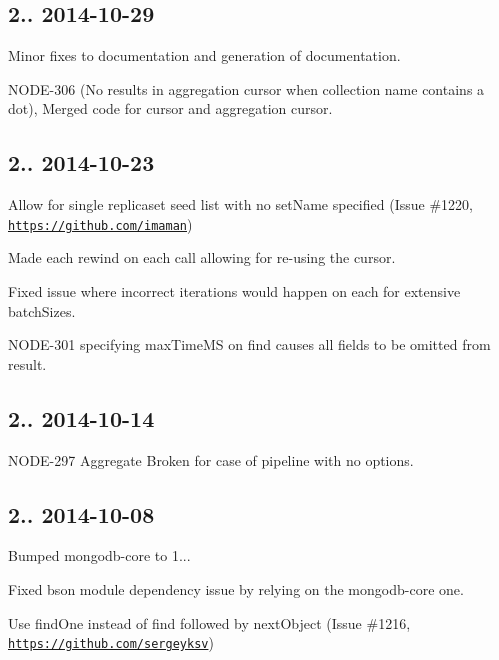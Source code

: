 \subsection*{2.. 2014-\/10-\/29 }


\begin{DoxyItemize}
\item Minor fixes to documentation and generation of documentation.
\item N\+O\+D\+E-\/306 (No results in aggregation cursor when collection name contains a dot), Merged code for cursor and aggregation cursor.
\end{DoxyItemize}

\subsection*{2.. 2014-\/10-\/23 }


\begin{DoxyItemize}
\item Allow for single replicaset seed list with no set\+Name specified (Issue \#1220, \href{https://github.com/imaman}{\tt https\+://github.\+com/imaman})
\item Made each rewind on each call allowing for re-\/using the cursor.
\item Fixed issue where incorrect iterations would happen on each for extensive batch\+Sizes.
\item N\+O\+D\+E-\/301 specifying max\+Time\+MS on find causes all fields to be omitted from result.
\end{DoxyItemize}

\subsection*{2.. 2014-\/10-\/14 }


\begin{DoxyItemize}
\item N\+O\+D\+E-\/297 Aggregate Broken for case of pipeline with no options.
\end{DoxyItemize}

\subsection*{2.. 2014-\/10-\/08 }


\begin{DoxyItemize}
\item Bumped mongodb-\/core to 1...
\item Fixed bson module dependency issue by relying on the mongodb-\/core one.
\item Use find\+One instead of find followed by next\+Object (Issue \#1216, \href{https://github.com/sergeyksv}{\tt https\+://github.\+com/sergeyksv})
\end{DoxyItemize}

